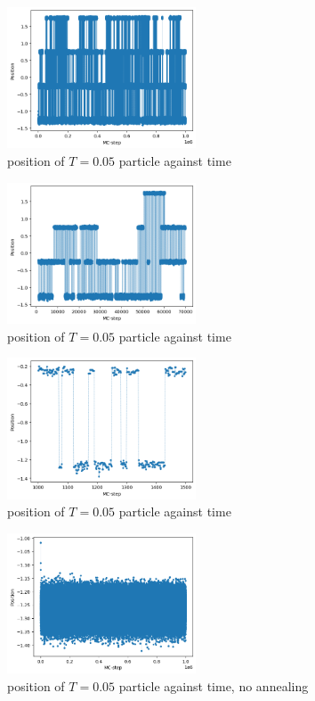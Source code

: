 \documentclass[11pt]{article}
\begin{document}
\begin{figure}[p]
	\centering
	\includegraphics[width = 0.5\textwidth]{steps_all.png}
	\caption{position of $T = 0.05$ particle against time}
	\label{fig:all}
\end{figure}
\begin{figure}[p]
	\centering
	\includegraphics[width = 0.5\textwidth]{steps_many.png}
	\caption{position of $T = 0.05$ particle against time}
	\label{fig:many}
\end{figure}
\begin{figure}[p]
	\centering
	\includegraphics[width = 0.5\textwidth]{steps_few.png}
	\caption{position of $T = 0.05$ particle against time}
	\label{fig:few}
\end{figure}
\begin{figure}
	\centering
	\includegraphics[width = 0.5\textwidth]{steps_no.png}
	\caption{position of $T = 0.05$ particle against time, no annealing}
	\label{fig:no}
\end{figure}
\end{document}
